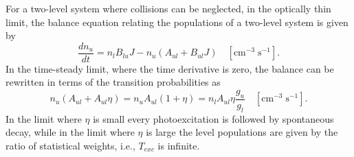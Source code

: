 For a two-level system where collisions can be neglected, in the optically
thin limit, the balance equation relating the populations of a two-level
system is given by
\begin{equation}
\frac{{d{n_u}}}{{dt}} = {n_l}{B_{lu}}J - {n_u}\left( {{A_{ul}} + {B_{ul}}J}
\right)
\quad  [\mathrm{cm}^{-3} \;\mathrm{s}^{-1}].
\end{equation}
In the time-steady limit, where the time derivative is zero, the balance
can be rewritten in terms of the transition probabilities as
\begin{equation}
{n_u}\left( {{A_{ul}} + {A_{ul}}\eta } \right) = {n_u}{A_{ul}}\left( {1
+ \eta } \right) = {n_l}{A_{ul}}\eta \frac{{{g_u}}}{{{g_l}}}
\quad  [\mathrm{cm}^{-3} \;\mathrm{s}^{-1}].
\end{equation}
In the limit where $\eta$ is small every photoexcitation is followed by
spontaneous decay, while in the limit where $\eta$ is large the level populations
are given by the ratio of statistical weights, i.e., $T_{exc}$ is infinite.



